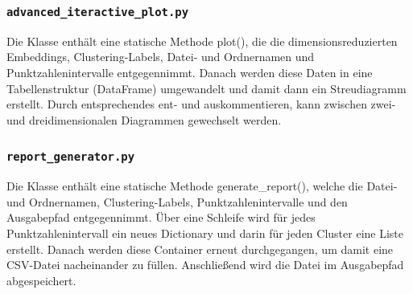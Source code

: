 \subsubsection*{\texttt{advanced\_iteractive\_plot.py}}
\label{abs:advanced-interactive-plot}
Die Klasse enthält eine statische Methode plot(), die die dimensionsreduzierten Embeddings, Clustering-Labels, Datei- und Ordnernamen und Punktzahlenintervalle entgegennimmt. Danach werden diese Daten in eine Tabellenstruktur (DataFrame) umgewandelt und damit dann ein Streudiagramm erstellt. Durch entsprechendes ent- und auskommentieren, kann zwischen zwei- und dreidimensionalen Diagrammen gewechselt werden.


\subsubsection*{\texttt{report\_generator.py}}
\label{abs:report-generator}
Die Klasse enthält eine statische Methode generate\_report(), welche die Datei- und Ordnernamen, Clustering-Labels, Punktzahlenintervalle und den Ausgabepfad entgegennimmt. Über eine Schleife wird für jedes Punktzahlenintervall ein neues Dictionary und darin für jeden Cluster eine Liste erstellt. Danach werden diese Container erneut durchgegangen, um damit eine CSV-Datei nacheinander zu füllen. Anschließend wird die Datei im Ausgabepfad abgespeichert.